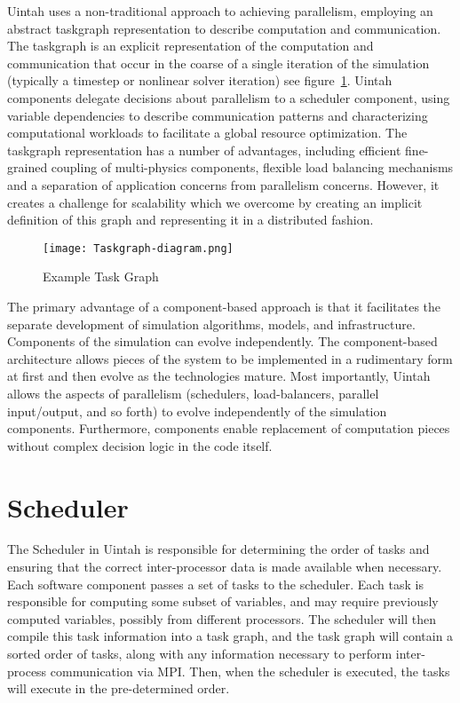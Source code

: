 \documentclass[11pt,fleqn]{book} %
\begin{document}
Uintah uses a non-traditional approach to achieving parallelism,
employing an abstract taskgraph representation to describe computation
and communication. The taskgraph is an explicit representation of the
computation and communication that occur in the coarse of a single
iteration of the simulation (typically a timestep or nonlinear solver
iteration) see figure~\ref{fig:TaskGraph}. Uintah components delegate
decisions about parallelism to a scheduler component, using variable
dependencies to describe communication patterns and characterizing
computational workloads to facilitate a global resource
optimization. The taskgraph representation has a number of advantages,
including efficient fine-grained coupling of multi-physics components,
flexible load balancing mechanisms and a separation of application
concerns from parallelism concerns. However, it creates a challenge
for scalability which we overcome by creating an implicit definition
of this graph and representing it in a distributed fashion.

\begin{figure}
  \texttt{[image: Taskgraph-diagram.png]}
  \caption{Example Task Graph}
  \label{fig:TaskGraph}
\end{figure}


The primary advantage of a component-based approach is that it
facilitates the separate development of simulation algorithms, models,
and infrastructure. Components of the simulation can evolve
independently. The component-based architecture allows pieces of the
system to be implemented in a rudimentary form at first and then
evolve as the technologies mature. Most importantly, Uintah allows the
aspects of parallelism (schedulers, load-balancers, parallel
input/output, and so forth) to evolve independently of the simulation
components. Furthermore, components enable replacement of computation
pieces without complex decision logic in the code itself.

\section{Scheduler}

The Scheduler in Uintah is responsible for determining the order of
tasks and ensuring that the correct inter-processor data is made
available when necessary. Each software component passes a set of
tasks to the scheduler. Each task is responsible for computing some
subset of variables, and may require previously computed variables,
possibly from different processors. The scheduler will then compile
this task information into a task graph, and the task graph will
contain a sorted order of tasks, along with any information necessary
to perform inter-process communication via MPI. Then, when the
scheduler is executed, the tasks will execute in the pre-determined
order.
\end{document}
